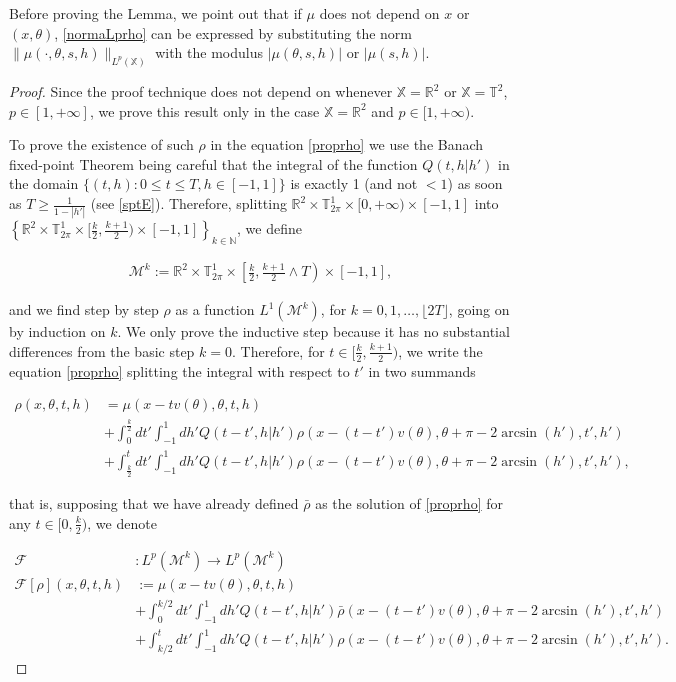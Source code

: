 \documentclass[a4paper,10pt,reqno]{amsart}
\numberwithin{equation}{subsection}
\numberwithin{figure}{subsection}
\begin{document}
Before proving the Lemma, we point out that if $\mu$ does not depend on $x$ or $(x,\theta)$, \eqref{normaLprho} can be expressed by substituting the norm $\|\mu(\cdot,\theta,s,h)\|_{L^p(\mathbb{X})}$ with the modulus $|\mu(\theta,s,h)|$ or $|\mu(s,h)|$.
\begin{proof} Since the proof technique does not depend on whenever $\mathbb{X}=\mathbb{R}^2$ or $\mathbb{X}=\mathbb{T}^2$, $p\in[1,+\infty]$, we prove this result only in the case $\mathbb{X}=\mathbb{R}^2$ and $p\in[1,+\infty)$.

To prove the existence of such $\rho$ in the equation \eqref{proprho} we use the Banach fixed-point Theorem being careful that the integral of the function $Q(t,h|h')$ in the domain $\{(t,h):0\leq t\leq T,h\in[-1,1]\}$ is exactly 1 (and not $<1$) as soon as $T\geq\frac{1}{1-|h'|}$ (see \eqref{sptE}). Therefore, splitting $\mathbb{R}^2\times\mathbb{T}^1_{2\pi}\times[0,+\infty)\times[-1,1]$ into $\left\{\mathbb{R}^2\times\mathbb{T}^1_{2\pi}\times[\frac{k}{2},\frac{k+1}{2})\times[-1,1]\right\}_{k\in\mathbb{N}}$, we define

\begin{align*}
{\mathcal M}^k:=\mathbb{R}^2\times\mathbb{T}^1_{2\pi}\times\left[\frac{k}{2},\frac{k+1}{2}\wedge T\right)\times[-1,1],
\end{align*}

and we find step by step $\rho$ as a function $L^1({\mathcal M}^k)$, for $ k=0,1,\dots,\lfloor2T\rfloor$, going on by induction on $k$. We only prove the inductive step because it has no substantial differences from the basic step $k=0$. Therefore, for $t\in[\frac{k}{2},\frac{k+1}{2})$, we write the equation \eqref{proprho} splitting the integral with respect to $t'$ in two summands

{\small\begin{align*}
\rho(x,\theta,t,h)&=\mu(x-tv(\theta),\theta,t,h)
\\
&+\int_0^{\frac{k}{2}}dt'\int_{-1}^1dh'Q(t-t',h|h')\rho(x-(t-t')v(\theta),\theta+\pi-2\arcsin(h'),t',h')
\\
&+\int_{\frac{k}{2}}^tdt'\int_{-1}^1dh'Q(t-t',h|h')\rho(x-(t-t')v(\theta),\theta+\pi-2\arcsin(h'),t',h'),
\end{align*}}

that is, supposing that we have already defined $\bar\rho$ as the solution of \eqref{proprho} for any $t\in[0,\frac{k}{2})$, we denote

{\small\begin{align*}
{\mathcal F}&:L^p({\mathcal M}^k)\to L^p({\mathcal M}^k)
\\
{\mathcal F}[\rho](x,\theta,t,h)&:=\mu(x-tv(\theta),\theta,t,h)
\\
&+\int_0^{k/2}dt'\int_{-1}^1dh' Q(t-t',h|h')\bar\rho(x-(t-t')v(\theta),\theta+\pi-2\arcsin(h'),t',h')
\\
&+\int_{k/2}^tdt'\int_{-1}^1dh' Q(t-t',h|h')\rho(x-(t-t')v(\theta),\theta+\pi-2\arcsin(h'),t',h').
\end{align*}}


\end{proof}
\end{document}
